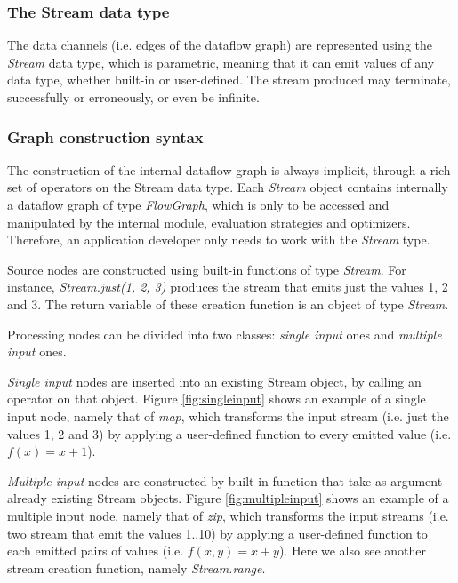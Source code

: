\documentclass[sigplan,review,anonymous]{acmart}\settopmatter{printfolios=true,printacmref=false}
\begin{document}
\subsubsection{The Stream data type}

The data channels (i.e. edges of the dataflow graph) are represented using the \textit{Stream} data type, which is parametric, meaning that it can emit values of any data type, whether built-in or user-defined. The stream produced may terminate, successfully or erroneously, or even be infinite.

\subsubsection{Graph construction syntax}

The construction of the internal dataflow graph is always implicit, through a rich set of operators on the Stream data type. Each \textit{Stream} object contains internally a dataflow graph of type \textit{FlowGraph}, which is only to be accessed and manipulated by the internal module, evaluation strategies and optimizers. Therefore, an application developer only needs to work with the \textit{Stream} type.

Source nodes are constructed using built-in functions of type \textit{Stream}. For instance, \textit{Stream.just(1, 2, 3)} produces the stream that emits just the values 1, 2 and 3. The return variable of these creation function is an object of type \textit{Stream}.

Processing nodes can be divided into two classes: \textit{single input} ones and \textit{multiple input} ones.

\textit{Single input} nodes are inserted into an existing Stream object, by calling an operator on that object. Figure \ref{fig:singleinput} shows an example of a single input node, namely that of \textit{map}, which transforms the input stream (i.e. just the values 1, 2 and 3) by applying a user-defined function to every emitted value (i.e. $f(x)=x+1$).


\textit{Multiple input} nodes are constructed by built-in function that take as argument already existing Stream objects. Figure \ref{fig:multipleinput} shows an example of a multiple input node, namely that of \textit{zip}, which transforms the input streams (i.e. two stream that emit the values 1..10) by applying a user-defined function to each emitted pairs of values (i.e. $f(x,y)=x+y$). Here we also see another stream creation function, namely \textit{Stream.range}.
\end{document}
